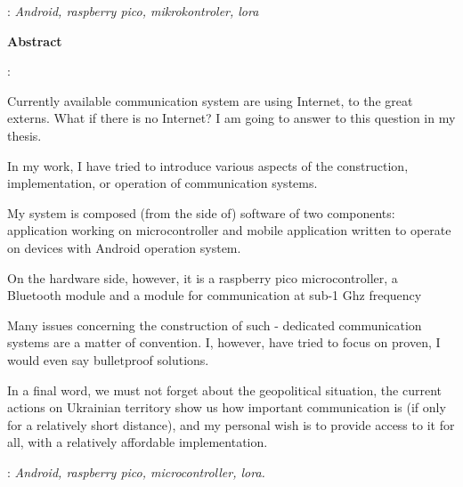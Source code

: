     : {\itshape Android, raspberry pico, mikrokontroler, lora}
    \par 
   \cleardoublepage
    \begin{center}{\large\bfseries Abstract}\par\bigskip\end{center}
    : \tytulen
    \par
    \vspace*{1\baselineskip}
    {
    Currently available communication system are using Internet, to the great externs. What if there is no Internet?
    I am going to answer to this question in my thesis.

	In my work, I have tried to introduce various aspects of the construction, implementation, or operation of communication systems.

	My system is composed (from the side of) software of two components: application working on microcontroller and mobile application written to operate on devices with Android operation system.

	On the hardware side, however, it is a raspberry pico microcontroller, a Bluetooth module and a module for communication at sub-1 Ghz frequency

	Many issues concerning the construction of such - dedicated communication systems are a matter of convention. I, however, have tried to focus on proven, I would even say bulletproof solutions.

	In a final word, we must not forget about the geopolitical situation, the current actions on Ukrainian territory show us how important communication is (if only for a relatively short distance), and my personal wish is to provide access to it for all, with a relatively affordable implementation.
    }
    \vspace*{1\baselineskip}

    : {\itshape Android, raspberry pico, microcontroller, lora.}
    
    

    \newpage
